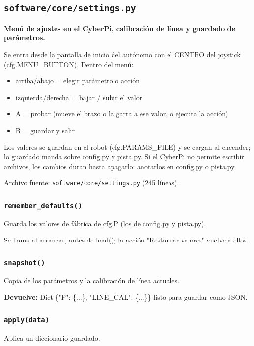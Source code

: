\subsection{\texttt{software/core/settings.py}}\label{mod:settings}
\textbf{Menú de ajustes en el CyberPi, calibración de línea y guardado de parámetros.}

Se entra desde la pantalla de inicio del autónomo con el CENTRO del joystick (cfg.MENU\_BUTTON). Dentro del menú:

\begin{itemize}\setlength\itemsep{0pt}
\item arriba/abajo = elegir parámetro o acción
\item izquierda/derecha = bajar / subir el valor
\item A = probar (mueve el brazo o la garra a ese valor, o ejecuta la acción)
\item B = guardar y salir
\end{itemize}
Los valores se guardan en el robot (cfg.PARAMS\_FILE) y se cargan al encender; lo guardado manda sobre config.py y pista.py. Si el CyberPi no permite escribir archivos, los cambios duran hasta apagarlo: anotarlos en config.py o pista.py.

\noindent Archivo fuente: \texttt{software/core/settings.py} (245 l\'ineas).

\subsubsection{\texttt{remember\_\allowbreak{}defaults()}}\label{fn:settings:remember-defaults}
\noindent Guarda los valores de fábrica de cfg.P (los de config.py y pista.py).

Se llama al arrancar, antes de load(); la acción "Restaurar valores" vuelve a ellos.


\subsubsection{\texttt{snapshot()}}\label{fn:settings:snapshot}
\noindent Copia de los parámetros y la calibración de línea actuales.

\noindent\textbf{Devuelve:} Dict \{"P": \{...\}, "LINE\_CAL": \{...\}\} listo para guardar como JSON.\par

\subsubsection{\texttt{apply(data)}}\label{fn:settings:apply}
\noindent Aplica un diccionario guardado.

